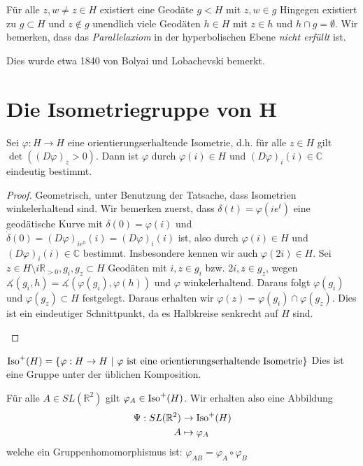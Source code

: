 \documentclass[../main.tex]{subfiles}
\begin{document}
\begin{remark}
    Für alle $z, w \not = z \in H$ existiert eine Geodäte $g < H$ mit $z,w \in g$
    Hingegen existiert zu $g \subset H$ und $z \not \in g$ unendlich viele Geodäten $h \in H$ mit $z \in h$ und $h \cap g = \emptyset$.
    Wir bemerken, dass das \emph{Parallelaxiom} in der hyperbolischen Ebene \emph{nicht erfüllt} ist.
    \begin{figure}[htb]
        \centering
        \def\svgwidth{30em}
                
    \end{figure}
\end{remark}
Dies wurde etwa 1840 von Bolyai und Lobachevski bemerkt.

\section{Die Isometriegruppe von H}
\begin{lemma}
    Sei $\varphi : H \to H$ eine orientierungserhaltende Isometrie,
    d.h. für alle $z \in H$ gilt $\det \left ((D\varphi)_z > 0 \right )$. Dann ist $\varphi$ durch
    $\varphi (i) \in H$ und $(D\varphi)_i(i) \in \mathbb{C}$ eindeutig bestimmt.
\end{lemma}
\begin{proof}
    Geometrisch, unter Benutzung der Tatsache, dass Isometrien winkelerhaltend sind. Wir bemerken zuerst,
    dass $\delta (t) = \varphi (ie^t)$ eine geodätische Kurve mit $\delta (0) = \varphi (i)$ und
    $\dot {\delta}(0) = (D\varphi)_{ie^0}(i)= (D\varphi)_i(i)$ ist, also durch $\varphi (i) \in H$ und $(D\varphi)_i(i) \in \mathbb{C}$ bestimmt.
    Insbesondere kennen wir auch $\varphi (2i)\in H$.
    Sei $z \in H \setminus i\mathbb{R}_{>0}, g_i, g_z \subset H$ Geodäten mit $i,z \in g_i$
    bzw. $2 i, z \in g_z$, wegen $\measuredangle  (g_i,h) = \measuredangle (\varphi (g_i), \varphi (h)) $ und $\varphi$ winkelerhaltend.
    Daraus folgt $\varphi (g_i)$ und $\varphi (g_z) \subset H$ festgelegt. Daraus erhalten wir $\varphi (z) = \varphi (g_i) \cap \varphi (g_z)$.
    Dies ist ein eindeutiger Schnittpunkt, da es Halbkreise senkrecht auf $H$ sind.
    \begin{figure}[htb]
        \centering
        \def\svgwidth{40em}
                
    \end{figure}
\end{proof}

\begin{definition}
    $\Iso ^+ (H) = \{ \varphi : H \to H \ | \ \varphi \text{ ist eine orientierungserhaltende Isometrie}\}$ 
    Dies ist eine Gruppe unter der üblichen Komposition.
\end{definition}
Für alle $A \in SL(\mathbb{R}^2)$ gilt $\varphi _A \in \operatorname{Iso}^+ (H)$.
Wir erhalten also eine Abbildung
\begin{align*}
    \Psi : SL(\mathbb{R}^2) &\to \operatorname{Iso} ^+(H) \\
    A &\mapsto \varphi _A 
\end{align*} welche ein Gruppenhomomorphismus ist: $\varphi _{AB} = \varphi _A \circ \varphi_B$
\end{document}
